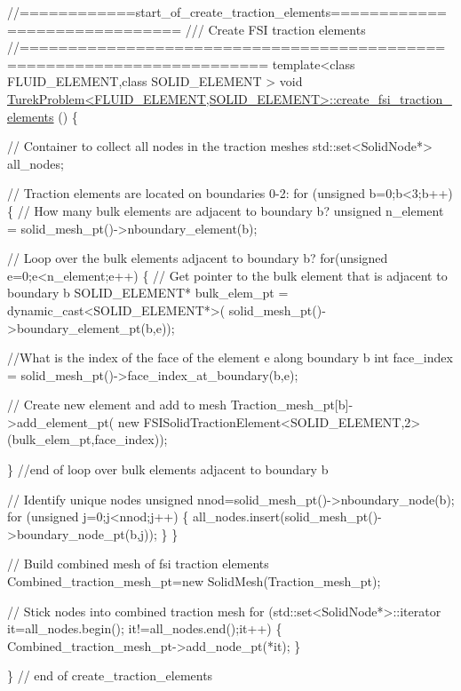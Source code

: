 \begin{DoxyCodeInclude}
\textcolor{comment}{//============start\_of\_create\_traction\_elements==============================}
\textcolor{comment}{/// Create FSI traction elements }
\textcolor{comment}{}\textcolor{comment}{//=======================================================================}
\textcolor{keyword}{template}<\textcolor{keyword}{class} FLUID\_ELEMENT,\textcolor{keyword}{class} SOLID\_ELEMENT >
\textcolor{keywordtype}{void} \hyperlink{classTurekProblem_ad460a2e860c9425297cf70ee125de10b}{TurekProblem<FLUID\_ELEMENT,SOLID\_ELEMENT>::create\_fsi\_traction\_elements}
      ()
\{

 \textcolor{comment}{// Container to collect all nodes in the traction meshes}
 std::set<SolidNode*> all\_nodes;

 \textcolor{comment}{// Traction elements are located on boundaries 0-2:}
 \textcolor{keywordflow}{for} (\textcolor{keywordtype}{unsigned} b=0;b<3;b++)
  \{
   \textcolor{comment}{// How many bulk elements are adjacent to boundary b?}
   \textcolor{keywordtype}{unsigned} n\_element = solid\_mesh\_pt()->nboundary\_element(b);
   
   \textcolor{comment}{// Loop over the bulk elements adjacent to boundary b?}
   \textcolor{keywordflow}{for}(\textcolor{keywordtype}{unsigned} e=0;e<n\_element;e++)
    \{
     \textcolor{comment}{// Get pointer to the bulk element that is adjacent to boundary b}
     SOLID\_ELEMENT* bulk\_elem\_pt = \textcolor{keyword}{dynamic\_cast<}SOLID\_ELEMENT*\textcolor{keyword}{>}(
      solid\_mesh\_pt()->boundary\_element\_pt(b,e));
     
     \textcolor{comment}{//What is the index of the face of the element e along boundary b}
     \textcolor{keywordtype}{int} face\_index = solid\_mesh\_pt()->face\_index\_at\_boundary(b,e);
          
     \textcolor{comment}{// Create new element and add to mesh}
     Traction\_mesh\_pt[b]->add\_element\_pt(
      \textcolor{keyword}{new} FSISolidTractionElement<SOLID\_ELEMENT,2>(bulk\_elem\_pt,face\_index));
     
    \} \textcolor{comment}{//end of loop over bulk elements adjacent to boundary b}

   \textcolor{comment}{// Identify unique nodes}
   \textcolor{keywordtype}{unsigned} nnod=solid\_mesh\_pt()->nboundary\_node(b);
   \textcolor{keywordflow}{for} (\textcolor{keywordtype}{unsigned} j=0;j<nnod;j++)
    \{
     all\_nodes.insert(solid\_mesh\_pt()->boundary\_node\_pt(b,j));
    \}
  \}

 \textcolor{comment}{// Build combined mesh of fsi traction elements}
 Combined\_traction\_mesh\_pt=\textcolor{keyword}{new} SolidMesh(Traction\_mesh\_pt);
 
 \textcolor{comment}{// Stick nodes into combined traction mesh}
 \textcolor{keywordflow}{for} (std::set<SolidNode*>::iterator it=all\_nodes.begin();
      it!=all\_nodes.end();it++)
  \{
   Combined\_traction\_mesh\_pt->add\_node\_pt(*it);
  \}

\} \textcolor{comment}{// end of create\_traction\_elements}

\end{DoxyCodeInclude}
